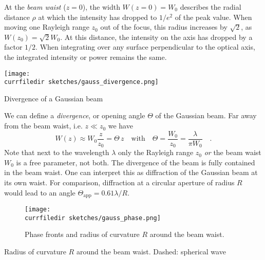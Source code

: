 At the \emph{beam waist} ($z=0$), the width $W(z=0) = W_0$ describes the radial distance $\rho$ at which the intensity  has dropped to $1/e^2$ of the peak value. When moving one Rayleigh range $z_0$ out of the focus, this radius increases by $\sqrt{2}$, as $W(z_0) = \sqrt{2} W_0$. At this distance, the intensity on the axis has dropped by a factor $1/2$. When integrating over any surface perpendicular to the optical axis, the integrated intensity or power remains the same.

\begin{marginfigure}
    \texttt{[image: \\currfiledir sketches/gauss\_divergence.png]}
   \caption{Divergence of a Gaussian beam}
\end{marginfigure}


We can define a \emph{divergence}, or opening angle $\Theta$ of the Gaussian beam. Far away from the beam waist, i.e. $z \ll z_0$ we have
\begin{equation}
    W(z) \approx W_0 \frac{z}{z_0} = \Theta \, z \quad \text{with} \quad \Theta = \frac{W_0}{z_0} = \frac{\lambda}{\pi W_0} \quad .
 \end{equation}
 Note that next to the wavelength $\lambda$ only the Rayleigh range $z_0$ \emph{or} the beam waist $W_0$ is a free parameter, not both. The divergence of the beam is fully contained in the beam waist. One can interpret this as diffraction of the Gaussian beam at its own waist. For comparison, diffraction at a circular aperture of radius $R$ would  lead to an angle $\Theta_\text{app} = 0.61 \lambda  / R$.

 \begin{figure}
    \texttt{[image: \\currfiledir sketches/gauss\_phase.png]}
   \caption{Phase fronts and radius of curvature $R$ around the beam waist.}
\end{figure}

\begin{marginfigure}
   \caption{Radius of curvature $R$ around the beam waist. Dashed: spherical wave}
\end{marginfigure}



